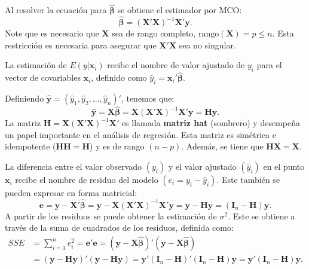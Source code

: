 \documentclass[
]{article}
\begin{document}
Al resolver la ecuación para \(\widehat{\boldsymbol \beta}\) se obtiene el estimador por MCO:
\[
\widehat{\boldsymbol \beta}= (\boldsymbol X'\boldsymbol X)^{-1}\boldsymbol X'\boldsymbol y.
\]
Note que es necesario que \(\boldsymbol X\) sea de rango completo, \(\mbox{rango}(\boldsymbol X) = p \leq n\). Esta restricción es necesaria para asegurar que \(\boldsymbol X'\boldsymbol X\) sea no singular.

La estimación de \(E(y|\boldsymbol x_i)\) recibe el nombre de valor ajustado de \(y_i\) para el vector de covariables \(\boldsymbol x_{i}\), definido como \(\widehat{y}_{i}= \boldsymbol x_{i}'\widehat{\boldsymbol \beta}\).

Definiendo \(\widehat{\boldsymbol y}= (\widehat{y}_{1},\widehat{y}_{2},\ldots,\widehat{y}_{n})'\), tenemos que:
\[
\widehat{\boldsymbol y}= \boldsymbol X\widehat{\boldsymbol \beta}= \boldsymbol X(\boldsymbol X'\boldsymbol X)^{-1}\boldsymbol X'\boldsymbol y= \boldsymbol H\boldsymbol y.
\]
La matriz \(\boldsymbol H= \boldsymbol X(\boldsymbol X'\boldsymbol X)^{-1}\boldsymbol X'\) es llamada \textbf{matriz hat} (sombrero) y desempeña un papel importante en el análisis de regresión. Esta matriz es simétrica e idempotente (\(\boldsymbol H\boldsymbol H= \boldsymbol H\)) y es de rango \((n-p)\). Además, se tiene que \(\boldsymbol H\boldsymbol X= \boldsymbol X\).

La diferencia entre el valor observado \((y_i)\) y el valor ajustado \((\widehat{y}_i)\) en el punto \(\boldsymbol x_i\) recibe el nombre de residuo del modelo \((e_{i}=y_{i}-\widehat{y}_{i})\). Este también se pueden expresar en forma matricial:
\[
\boldsymbol e= \boldsymbol y- \boldsymbol X'\widehat{\boldsymbol \beta}= \boldsymbol y- \boldsymbol X(\boldsymbol X'\boldsymbol X)^{-1}\boldsymbol X'\boldsymbol y= \boldsymbol y- \boldsymbol H\boldsymbol y= (\boldsymbol I_{n} - \boldsymbol H)\boldsymbol y.
\]
A partir de los residuos se puede obtener la estimación de \(\sigma^2\). Este se obtiene a través de la suma de cuadrados de los residuos, definida como:
\begin{equation}
\begin{split}
SSE &= \sum_{i=1}^{n}e^{2}_{i} = \boldsymbol e'\boldsymbol e= (\boldsymbol y- \boldsymbol X\widehat{\boldsymbol \beta})'(\boldsymbol y- \boldsymbol X\widehat{\boldsymbol \beta}) \\
&= (\boldsymbol y- \boldsymbol H\boldsymbol y)'(\boldsymbol y- \boldsymbol H\boldsymbol y) = \boldsymbol y'(\boldsymbol I_{n}-\boldsymbol H)'(\boldsymbol I_{n}-\boldsymbol H)\boldsymbol y= \boldsymbol y'(\boldsymbol I_{n} - \boldsymbol H)\boldsymbol y.
\end{split}
\nonumber
\end{equation}
\end{document}

